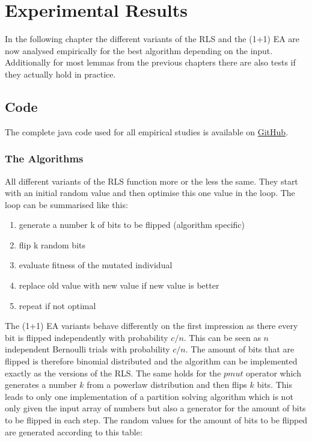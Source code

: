 \chapter{Experimental Results}\label{ch:expRes}

In the following chapter the different variants of the RLS and the (1+1) EA are now analysed empirically for the best algorithm depending on the input.
Additionally for most lemmas from the previous chapters there are also tests if they actually hold in practice.

\section{Code}
The complete java code used for all empirical studies is available on \href{https://github.com/Err404NameNotFound/PartitionSolvingWithEAs}{GitHub}.
\subsection{The Algorithms}
All different variants of the RLS function more or the less the same. They start with an initial random value and then optimise this one value in the loop. The loop can be summarised like this:
\begin{enumerate}
      \item generate a number k of bits to be flipped (algorithm specific)
      \item flip k random bits
      \item evaluate fitness of the mutated individual
      \item replace old value with new value if new value is better
      \item repeat if not optimal
\end{enumerate}
The (1+1) EA variants behave differently on the first impression as there every bit is flipped independently with probability $c/n$.
This can be seen as $n$ independent Bernoulli trials with probability $c/n$.
The amount of bits that are flipped is therefore binomial distributed and the algorithm can be implemented exactly as the versions of the RLS. The same holds for the $pmut$ operator which generates a number $k$ from a powerlaw distribution and then flips $k$ bits.
This leads to only one implementation of a partition solving algorithm which is not only given the input array of numbers but also a generator for the amount of bits to be flipped in each step.
The random values for the amount of bits to be flipped are generated according to this table:


